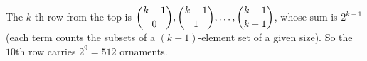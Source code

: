 The $k$-th row from the top is $\dbinom{k-1}{0},\dbinom{k-1}{1},\dots,\dbinom{k-1}{k-1}$, whose sum is $2^{k-1}$ (each term counts the subsets of a $(k-1)$-element set of a given size). So the $10$th row carries $2^9=\boxed{512}$ ornaments.

